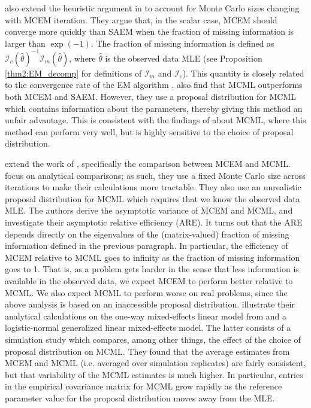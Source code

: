 \documentclass[11pt, oneside]{article}   	%
\begin{document}
\citet{Boo01} also extend the heuristic argument in \citet{Gu98I} to account for Monte Carlo sizes changing with MCEM iteration. They argue that, in the scalar case, MCEM should converge more quickly than SAEM when the fraction of missing information is larger than $\exp(-1)$. The fraction of missing information is defined as $\mathcal{I}_c(\hat{\theta})^{-1} \mathcal{I}_m(\hat{\theta})$, where $\hat{\theta}$ is the observed data MLE (see Proposition \ref{thm2:EM_decomp} for definitions of $\mathcal{I}_m$ and $\mathcal{I}_c$). This quantity is closely related to the convergence rate of the EM algorithm \citep{Men94,McL08}. \citeauthor{Boo01} also find that MCML outperforms both MCEM and SAEM. However, they use a proposal distribution for MCML which contains information about the parameters, thereby giving this method an unfair advantage. This is consistent with the findings of \citet{McC97} about MCML, where this method can perform very well, but is highly sensitive to the choice of proposal distribution.

\citet{Jan03} extend the work of \citet{Boo01}, specifically the comparison between MCEM and MCML. \citeauthor{Jan03} focus on analytical comparisons; as such, they use a fixed Monte Carlo size across iterations to make their calculations more tractable. They also use an unrealistic proposal distribution for MCML which requires that we know the observed data MLE. The authors derive the asymptotic variance of MCEM and MCML, and investigate their asymptotic relative efficiency (ARE). It turns out that the ARE depends directly on the eigenvalues of the (matrix-valued) fraction of missing information defined in the previous paragraph. In particular, the efficiency of MCEM relative to MCML goes to infinity as the fraction of missing information goes to 1. That is, as a problem gets harder in the sense that less information is available in the observed data, we expect MCEM to perform better relative to MCML. We also expect MCML to perform worse on real problems, since the above analysis is based on an inaccessible proposal distribution. \citeauthor{Jan03} illustrate their analytical calculations on the one-way mixed-effects linear model from \citet{Boo01} and a logistic-normal generalized linear mixed-effects model. The latter consists of a simulation study which compares, among other things, the effect of the choice of proposal distribution on MCML. They found that the average estimates from MCEM and MCML (i.e. averaged over simulation replicates) are fairly consistent, but that variability of the MCML estimates is much higher. In particular, entries in the empirical covariance matrix for MCML grow rapidly as the reference parameter value for the proposal distribution moves away from the MLE.
\end{document}

